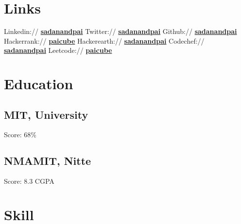 \documentclass{resumecustom}%
\begin{document}
%
\pagestyle{fancy}%
\fancyhf{}%
\lastupdated%
%
\begin{minipage}[t]{0.31\textwidth}%
\section{Links}%
\label{sec:Links}%
Linkedin:// %
\href{https://www.linkedin.com/in/sadanandpai/}{\textbf{sadanandpai}}%
\newline%
%
Twitter:// %
\href{https://www.twitter.com/sadanandpai/}{\textbf{sadanandpai}}%
\newline%
%
Github:// %
\href{https://github.com/sadanandpai/}{\textbf{sadanandpai}}%
\newline%
%
Hackerrank:// %
\href{https://www.hackerrank.com/paicube/}{\textbf{paicube}}%
\newline%
%
Hackerearth:// %
\href{https://www.hackerearth.com/sadanandpai/}{\textbf{sadanandpai}}%
\newline%
%
Codechef:// %
\href{https://www.codechef.com/sadanandpai/}{\textbf{sadanandpai}}%
\newline%
%
Leetcode:// %
\href{https://leetcode.com/paicube/}{\textbf{paicube}}%
\newline%

%
\section{Education}%
\label{sec:Education}%
\subsection{MIT, University}%
\label{subsec:MIT,University}%
%
%
Score: 68\%%
\sectionsep

%
\subsection{NMAMIT, Nitte}%
\label{subsec:NMAMIT,Nitte}%
%
%
Score: 8.3 CGPA%
\sectionsep

%
\section{Skill}%
\label{sec:Skill}%

\end{minipage}
\end{document}
